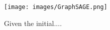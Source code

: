 \begin{figure}[t]
\centering
  \texttt{[image: images/GraphSAGE.png]}
\caption{Given the initial....}
  \label{fig:GraphSAGE}    
\end{figure}